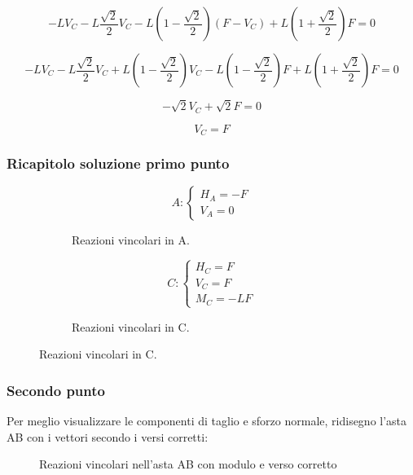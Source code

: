 \documentclass[main.tex]{subfiles}
\begin{document}
\begin{equation}
	-LV_C - L\dfrac{\sqrt{2}}{2}V_C - L(1 - \dfrac{\sqrt{2}}{2})(F - V_C) + L(1+\dfrac{\sqrt{2}}{2})F = 0
\end{equation}

\begin{equation}
	-LV_C - L\dfrac{\sqrt{2}}{2}V_C  + L(1 - \dfrac{\sqrt{2}}{2})V_C - L(1 - \dfrac{\sqrt{2}}{2})F + L(1+\dfrac{\sqrt{2}}{2})F = 0
\end{equation}

\begin{equation}
	-\sqrt{2}V_C +\sqrt{2}F = 0
\end{equation}

\begin{equation}
	V_C = F
\end{equation}


\subsubsection{Ricapitolo soluzione primo punto}
\begin{figure}[H]
  \begin{subfigure}[b]{.5\textwidth}
  \centering
  \[
  	A: \begin{cases}
		H_A = -F\\
		V_A = 0
  	\end{cases}
  \]
  \caption{Reazioni vincolari in A.}
  \end{subfigure}
  \hfill
  \begin{subfigure}[b]{.5\textwidth}
  \centering
  \[
  	C: \begin{cases}
  		H_C = F\\
  		V_C = F\\
  		M_C = -LF
  	\end{cases}  
  \]
  \caption{Reazioni vincolari in C.}
  \end{subfigure}
\end{figure}

\subsubsection{Secondo punto}
Per meglio visualizzare le componenti di taglio e sforzo normale, ridisegno l'asta AB con i vettori secondo i versi corretti:

\begin{figure}[H]
\centering
\resizebox{.5\textwidth}{!}{}
\caption{Reazioni vincolari nell'asta AB con modulo e verso corretto}
\end{figure}
\end{document}
